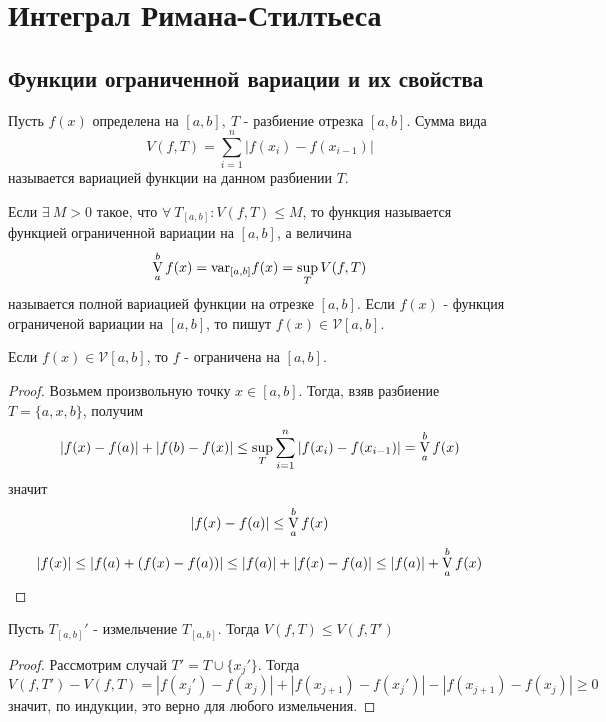 \newpage
\section{Интеграл Римана-Стилтьеса}
\subsection{Функции ограниченной вариации и их свойства}
\begin{definition}
    Пусть $f(x)$ определена на $[a,b],\ T$ - разбиение отрезка $[a,b]$. Сумма вида 
    \[V(f,T)=\sum\limits_{i=1}^{n}|f(x_i)-f(x_{i-1})|\]
    называется вариацией функции на данном разбиении $T$.
\end{definition} 
\begin{definition}
    Если $\exists\ M>0$ такое, что $\forall\ T_{[a,b]}: V(f,T)\leq M$, то функция называется функцией ограниченной вариации на $[a,b]$, а величина
    \[\operatorname*{V}\limits_{a}^{b} f(x)=\text{var}_{[a,b]}f(x)=\sup\limits_{T}V(f,T)\] %
    называется полной вариацией функции на отрезке $[a,b]$. Если $f(x)$ - функция ограниченой вариации на $[a,b]$, то пишут $f(x)\in \mathcal{V}[a,b]$.
\end{definition} 
\begin{numtheorem}
    Если $f(x)\in \mathcal{V}[a,b]$, то $f$ - ограничена на $[a,b]$.
\end{numtheorem}
\begin{proof}
    Возьмем произвольную точку $x\in [a,b]$. Тогда, взяв разбиение $T=\{a,x,b\}$, получим
    \[|f(x)-f(a)|+|f(b)-f(x)|\leq\sup\limits_{T}\sum\limits_{i=1}^{n}|f(x_i)-f(x_{i-1})|=\operatorname*{V}\limits_{a}^{b}f(x)\]
    значит 
    \[|f(x)-f(a)|\leq \operatorname*{V}\limits_{a}^{b}f(x)\]
    \[|f(x)|\leq |f(a)+(f(x)-f(a))|\leq |f(a)|+|f(x)-f(a)|\leq |f(a)|+\operatorname*{V}\limits_{a}^{b}f(x)\]
\end{proof}
\begin{numtheorem}
    Пусть $T_{[a,b]}'$ - измельчение $T_{[a,b]}$. Тогда $V(f, T)\leq V(f, T')$
\end{numtheorem} 
\begin{proof}
    Рассмотрим случай $T'=T\cup \{x_j'\}$. Тогда
    \[V(f,T')-V(f,T)=|f(x_j')-f(x_j)|+|f(x_{j+1})-f(x_j')|-|f(x_{j+1})-f(x_j)|\geq 0\]
    значит, по индукции, это верно для любого измельчения.
\end{proof} 
